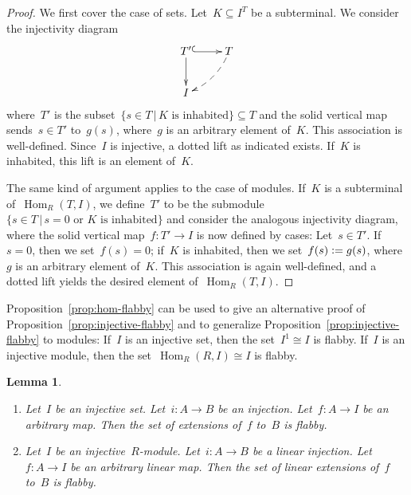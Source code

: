 \documentclass[oneside]{amsart}
\theoremstyle{definition}
\theoremstyle{plain}
\newtheorem{lemma}[defn]{Lemma}
\theoremstyle{remark}
\newcommand{\defeq}{\vcentcolon=}
\DeclareMathOperator{\Hom}{Hom}
\renewcommand{\_}{\mathpunct{.}\,}
\begin{document}
\begin{proof}We first cover the case of sets. Let~$K \subseteq I^T$ be a
subterminal. We consider the injectivity diagram
\[ \xymatrix{
  T' \ar@{^{(}->}[r]\ar[d] & T \ar@{-->}@/^/[ld] \\
  I
} \]
where~$T'$ is the subset~$\{ s \in T \,|\, \text{$K$ is inhabited} \} \subseteq T$ and the
solid vertical map sends~$s \in T'$ to~$g(s)$, where~$g$ is an arbitrary element
of~$K$. This association is well-defined. Since~$I$ is injective, a dotted lift
as indicated exists. If~$K$ is inhabited, this lift is an element of~$K$.

The same kind of argument applies to the case of modules. If~$K$ is a
subterminal of~$\Hom_R(T,I)$, we define~$T'$ to be the submodule
$\{ s \in T \,|\, \text{$s = 0$ or $K$ is inhabited} \}$ and consider the
analogous injectivity diagram, where the solid vertical map~$f : T' \to I$ is now
defined by cases: Let~$s \in T'$. If~$s = 0$, then we set~$f(s) = 0$; if~$K$ is
inhabited, then we set~$f(s) \defeq g(s)$, where~$g$ is an arbitrary element
of~$K$. This association is again well-defined, and a dotted lift yields the
desired element of~$\Hom_R(T,I)$.
\end{proof}

Proposition~\ref{prop:hom-flabby} can be used to give an alternative proof of
Proposition~\ref{prop:injective-flabby} and to generalize
Proposition~\ref{prop:injective-flabby} to modules: If~$I$ is an injective set,
then the set~$I^1 \cong I$ is flabby. If~$I$ is an injective module, then the
set~$\Hom_R(R,I) \cong I$ is flabby.

\begin{lemma}\label{lemma:set-of-extensions-flabby}
\begin{enumerate}
\item Let~$I$ be an injective set. Let~$i : A \to B$ be an injection.
Let~$f : A \to I$ be an arbitrary map. Then the set of extensions of~$f$ to~$B$
is flabby.
\item Let~$I$ be an injective~$R$-module. Let~$i : A \to B$ be a linear injection.
Let~$f : A \to I$ be an arbitrary linear map. Then the set of linear extensions of~$f$ to~$B$
is flabby.
\end{enumerate}
\end{lemma}
\end{document}
